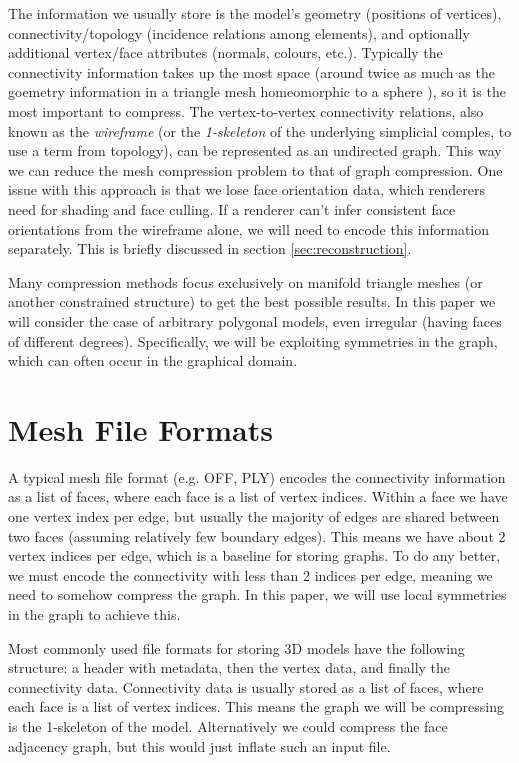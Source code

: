 \documentclass{egpubl}
\begin{document}
The information we usually store is the model's geometry (positions of vertices), connectivity/topology (incidence relations among elements), and optionally additional vertex/face attributes (normals, colours, etc.).
Typically the connectivity information takes up the most space (around twice as much as the goemetry information in a triangle mesh homeomorphic to a sphere \cite{rossignac1999edgebreaker}), so it is the most important to compress.
The vertex-to-vertex connectivity relations, also known as the \textit{wireframe} (or the \textit{1-skeleton} of the underlying simplicial comples, to use a term from topology),
can be represented as an undirected graph.
This way we can reduce the mesh compression problem to that of graph compression.
One issue with this approach is that we lose face orientation data, which renderers need for shading and face culling. If a renderer can't infer consistent face orientations from the wireframe alone, we will need to encode this information separately. This is briefly discussed in section \ref{sec:reconstruction}.

Many compression methods focus exclusively on manifold triangle meshes (or another constrained structure) to get the best possible results.  
In this paper we will consider the case of arbitrary polygonal models, even irregular (having faces of different degrees).
Specifically, we will be exploiting symmetries in the graph, which can often occur in the graphical domain.

\section{Mesh File Formats}

A typical mesh file format (e.g. OFF, PLY) encodes the connectivity information as a list of faces, where each face is a list of vertex indices. Within a face we have one vertex index per edge, but usually the majority of edges are shared between two faces (assuming relatively few boundary edges). This means we have about 2 vertex indices per edge, which is a baseline for storing graphs. To do any better, we must encode the connectivity with less than 2 indices per edge, meaning we need to somehow compress the graph. In this paper, we will use local symmetries in the graph to achieve this.

Most commonly used file formats for storing 3D models have the following structure: a header with metadata, then the vertex data, and finally the connectivity data. Connectivity data is usually stored as a list of faces, where each face is a list of vertex indices. This means the graph we will be compressing is the 1-skeleton of the model. Alternatively we could compress the face adjacency graph, but this would just inflate such an input file.
\end{document}
